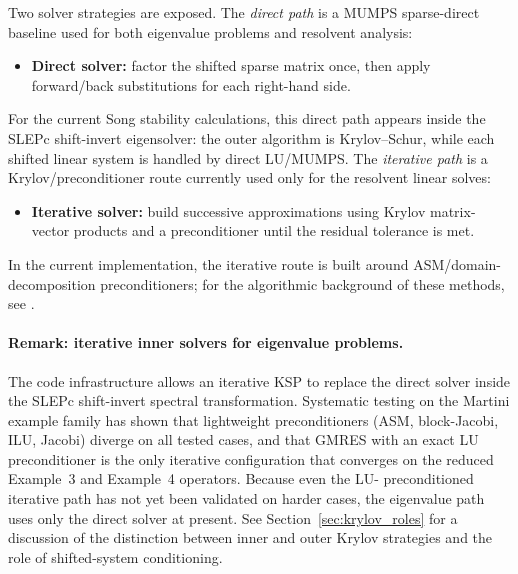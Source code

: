 \documentclass[11pt]{article}
\begin{document}
Two solver strategies are exposed. The \emph{direct path} is a MUMPS
sparse-direct baseline used for both eigenvalue problems and resolvent
analysis:
\begin{itemize}[nosep]
  \item \textbf{Direct solver:} factor the shifted sparse matrix once, then
    apply forward/back substitutions for each right-hand side.
\end{itemize}
For the current Song stability calculations, this direct path appears inside
the SLEPc shift-invert eigensolver: the outer algorithm is Krylov--Schur,
while each shifted linear system is handled by direct LU/MUMPS.
The \emph{iterative path} is a Krylov/preconditioner route currently used only
for the resolvent linear solves:
\begin{itemize}[nosep]
  \item \textbf{Iterative solver:} build successive approximations using
    Krylov matrix-vector products and a preconditioner until the residual
    tolerance is met.
\end{itemize}
In the current implementation, the iterative route is built around
ASM/domain-decomposition preconditioners; for the algorithmic background of
these methods, see \citet{dolean2015introduction}.

\paragraph{Remark: iterative inner solvers for eigenvalue problems.}
The code infrastructure allows an iterative KSP to replace the direct solver
inside the SLEPc shift-invert spectral transformation. Systematic testing on
the Martini example family has shown that lightweight preconditioners (ASM,
block-Jacobi, ILU, Jacobi) diverge on all tested cases, and that GMRES with
an exact LU preconditioner is the only iterative configuration that converges
on the reduced Example~3 and Example~4 operators. Because even the LU-
preconditioned iterative path has not yet been validated on harder cases,
the eigenvalue path uses only the direct solver at present. See
Section~\ref{sec:krylov_roles} for a discussion of the distinction between
inner and outer Krylov strategies and the role of shifted-system conditioning.
\end{document}
